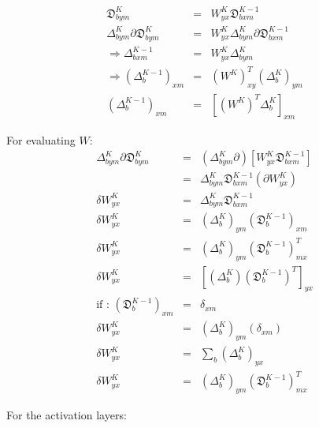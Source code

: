 \begin{eqnarray*}
    \mathfrak{D}_{bym}^{K} & = & W_{yx}^{K}\mathfrak{D}_{bxm}^{K-1}\\
    \Delta_{bym}^{K}\partial\mathfrak{D}_{bym}^{K} & = & W_{yx}^{K}\Delta_{bym}^{K}\partial\mathfrak{D}_{bxm}^{K-1}\\
    \Rightarrow\Delta_{bxm}^{K-1} & = & W_{yx}^{K}\Delta_{bym}^{K}\\
    \Rightarrow\left(\Delta_{b}^{K-1}\right)_{xm} & = & \left(W^{K}\right)_{xy}^{T}\left(\Delta_{b}^{K}\right)_{ym}\\
    \left(\Delta_{b}^{K-1}\right)_{xm} & = & \left[\left(W^{K}\right)^{T}\Delta_{b}^{K}\right]_{xm}
\end{eqnarray*}

For evaluating $W$:
\begin{eqnarray*}
    \Delta_{bym}^{K}\partial\mathfrak{D}_{bym}^{K} & = & \left(\Delta_{bym}^{K}\partial\right)\left[W_{yx}^{K}\mathfrak{D}_{bxm}^{K-1}\right]\\
    & = & \Delta_{bym}^{K}\mathfrak{D}_{bxm}^{K-1}\left(\partial W_{yx}^{K}\right)\\
    \delta W_{yx}^{K} & = & \Delta_{bym}^{K}\mathfrak{D}_{bxm}^{K-1}\\
    \delta W_{yx}^{K} & = & \left(\Delta_{b}^{K}\right)_{ym}\left(\mathfrak{D}_{b}^{K-1}\right)_{xm}\\
    \delta W_{yx}^{K} & = & \left(\Delta_{b}^{K}\right)_{ym}\left(\mathfrak{D}_{b}^{K-1}\right)_{mx}^{T}\\
    \delta W_{yx}^{K} & = & \left[\left(\Delta_{b}^{K}\right)\left(\mathfrak{D}_{b}^{K-1}\right)^{T}\right]_{yx}\\
    \text{if : }\left(\mathfrak{D}_{b}^{K-1}\right)_{xm} & = & \delta_{xm}\\
    \delta W_{yx}^{K} & = & \left(\Delta_{b}^{K}\right)_{ym}\left(\delta_{xm}\right)\\
    \delta W_{yx}^{K} & = & \sum_{b}\left(\Delta_{b}^{K}\right)_{yx}\\
    \delta W_{yx}^{K} & = & \left(\Delta_{b}^{K}\right)_{ym}\left(\mathfrak{D}_{b}^{K-1}\right)_{mx}^{T}
\end{eqnarray*}

For the activation layers:

